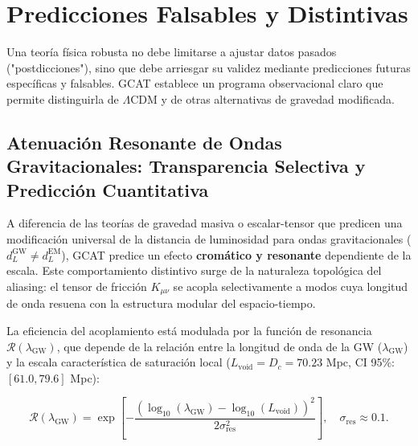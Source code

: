 \documentclass[12pt, a4paper]{article}
\theoremstyle{plain}
\theoremstyle{definition}
\begin{document}
\section{Predicciones Falsables y Distintivas}
\label{sec:predicciones}

Una teoría física robusta no debe limitarse a ajustar datos pasados ("postdicciones"), sino que debe arriesgar su validez mediante predicciones futuras específicas y falsables. GCAT establece un programa observacional claro que permite distinguirla de $\Lambda$CDM y de otras alternativas de gravedad modificada.

\subsection{Atenuación Resonante de Ondas Gravitacionales: Transparencia Selectiva y Predicción Cuantitativa}

A diferencia de las teorías de gravedad masiva o escalar-tensor que predicen una modificación universal de la distancia de luminosidad para ondas gravitacionales ($d_L^{\text{GW}} \neq d_L^{\text{EM}}$), GCAT predice un efecto \textbf{cromático y resonante} dependiente de la escala. Este comportamiento distintivo surge de la naturaleza topológica del aliasing: el tensor de fricción $K_{\mu\nu}$ se acopla selectivamente a modos cuya longitud de onda resuena con la estructura modular del espacio-tiempo.

La eficiencia del acoplamiento está modulada por la función de resonancia $\mathcal{R}(\lambda_{\text{GW}})$, que depende de la relación entre la longitud de onda de la GW ($\lambda_{\text{GW}}$) y la escala característica de saturación local ($L_{\text{void}} = D_c = 70.23$ Mpc, CI 95\%: $[61.0, 79.6]$ Mpc):

\begin{equation}
\mathcal{R}(\lambda_{\text{GW}}) = \exp\left[-\frac{\left(\log_{10}(\lambda_{\text{GW}}) - \log_{10}(L_{\text{void}})\right)^2}{2\sigma_{\text{res}}^2}\right], \quad \sigma_{\text{res}} \approx 0.1.
\label{eq:resonance_profile}
\end{equation}
\end{document}
